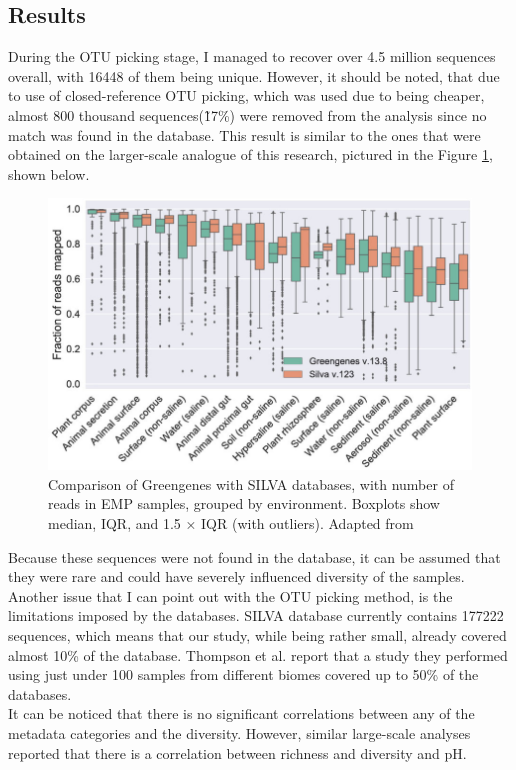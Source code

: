 \documentclass{article}
\begin{document}
\begin{multicols}{2}
\section{Results}
During the OTU picking stage, I managed to recover over 4.5 million sequences overall, with 16448 of them being unique. However, it should be noted, that due to use of closed-reference OTU picking, which was used due to being cheaper, almost 800 thousand sequences(1̃7\%) were removed from the analysis since no match was found in the database. This result is similar to the ones that were obtained on the larger-scale analogue of this research, pictured in the Figure \ref{fig:EMP_Silva}, shown below.
\begin{figure}[H]
	\includegraphics[width=1\linewidth]{./figs/EMP_SILVA.jpg}
	\caption{Comparison of Greengenes with SILVA databases, with number of reads in EMP samples, grouped by environment. Boxplots show median, IQR, and 1.5 × IQR (with outliers). Adapted from \cite{Thompson2017}}
	\label{fig:EMP_Silva}
\end{figure}
Because these sequences were not found in the database, it can be assumed that they were rare and could have
severely influenced diversity of the samples. Another issue that I can point out with the OTU picking method, is the limitations imposed by the databases. SILVA database currently contains 177222 sequences, which means that our study, while being rather small, already covered almost 10\% of the database. Thompson et al.\cite{Thompson2017} report that a study they performed using just under 100 samples from different biomes covered up to 50\% of the databases. \\
It can be noticed that there is no significant correlations between any of the metadata categories and the diversity. However, similar large-scale analyses reported that there is a correlation between richness and diversity and pH\cite{Thompson2017,Fierer2006,Wu2016}. 

\end{multicols}
\end{document}
